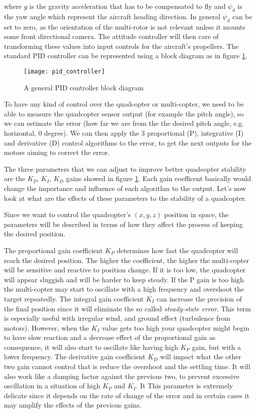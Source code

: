 where $g$ is the gravity acceleration that has to be compensated to fly and $\psi_d$ is the yaw angle which represent the aircraft heading direction. In general $\psi_d$ can be set to zero, as the orientation of the multi-rotor is not relevant unless it mounts some front directional camera. The attitude controller will then care of transforming these values into input controls for the aircraft's propellers. The standard PID controller can be represented using a block diagram as in figure \ref{fig:pid_blockDiag}.

\begin{figure}[h]
\texttt{[image: pid\_controller]}
\caption{A general PID controller block diagram}
\label{fig:pid_blockDiag}
\end{figure}


To have any kind of control over the quadcopter or multi-copter, we need to be able to measure the quadcopter sensor output (for example the pitch angle), so we can estimate the error (how far we are from the the desired pitch angle, e.g. horizontal, 0 degree). We can then apply the 3 proportional (P), integrative (I) and derivative (D) control algorithms to the error, to get the next outputs for the motors aiming to correct the error.

The three parameters that we can adjust to improve better quadcopter stability are the $K_P$, $K_I$, $K_D$ gains showed in figure \ref{fig:pid_blockDiag}. Each gain coefficent basically would change the importance and influence of each algorithm to the output. Let's now look at what are the effects of these parameters to the stability of a quadcopter.


Since we want to control the quadcopter's $(x,y,z)$ position in space, the parameters will be described in terms of how they affect the process of keeping the desired position.

The proportional gain coefficient $K_P$ determines how fast the quadcopter will reach the desired position. The higher the coefficient, the higher the multi-copter will be sensitive and reactive to position change. If it is too low, the quadcopter will appear sluggish and will be harder to keep steady. If the P gain is too high the multi-copter may start to oscillate with a high frequency and overshoot the target repeatedly. %
The integral gain coefficient $K_I$ can increase the precision of the final position since it will eliminate the so called \emph{steady-state error}. This term is especially useful with irregular wind, and ground effect (turbulence from motors). However, when the $K_I$ value gets too high your quadcopter might begin to have slow reaction and a decrease effect of the proportional gain as consequence, it will also start to oscillate like having high $K_P$ gain, but with a lower frequency. %
The derivative gain coefficient $K_D$ will impact what the other two gain cannot control that is reduce the overshoot and the settling time. It will also work like a damping factor against the previous two, to prevent excessive oscillation in a situation of high $K_P$ and $K_I$. It  This parameter is extremely delicate since it depends on the rate of change of the error and in certain cases it may amplify the effects of the previous gains.  %

